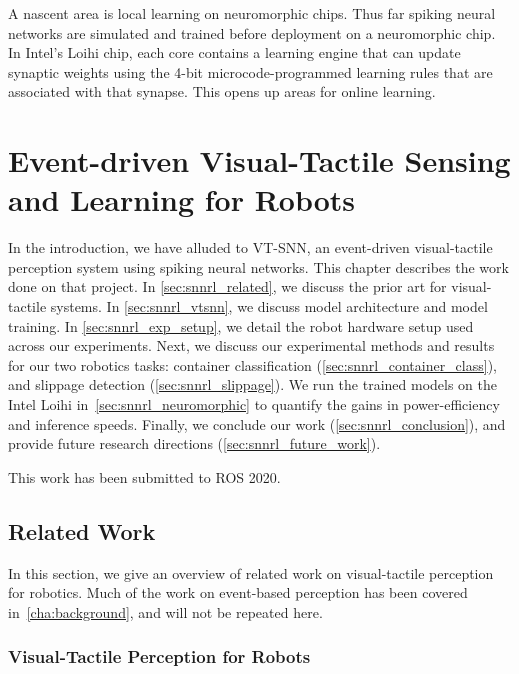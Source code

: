 \documentclass[fyp]{socreport}
\begin{document}
A nascent area is local learning on neuromorphic chips. Thus far spiking neural
networks are simulated and trained before deployment on a neuromorphic chip. In
Intel's Loihi chip, each core contains a learning engine that can update
synaptic weights using the 4-bit microcode-programmed learning rules that are
associated with that synapse. This opens up areas for online learning.

\chapter{Event-driven Visual-Tactile Sensing and Learning for Robots\label{cha:vtsnn}}

In the introduction, we have alluded to VT-SNN, an event-driven
visual-tactile perception system using spiking neural networks. This chapter
describes the work done on that project. In \autoref{sec:snnrl_related}, we
discuss the prior art for visual-tactile systems. In \autoref{sec:snnrl_vtsnn},
we discuss model architecture and model training. In
\autoref{sec:snnrl_exp_setup}, we detail the robot hardware setup used across
our experiments. Next, we discuss our experimental methods and results for our
two robotics tasks: container classification
(\autoref{sec:snnrl_container_class}), and slippage detection
(\autoref{sec:snnrl_slippage}). We run the trained models on the Intel Loihi
in~\autoref{sec:snnrl_neuromorphic} to quantify the gains in power-efficiency
and inference speeds. Finally, we conclude our work
(\autoref{sec:snnrl_conclusion}), and provide future research directions
(\autoref{sec:snnrl_future_work}).

This work has been submitted to ROS 2020.

\section{Related Work\label{sec:snnrl_related}}

In this section, we give an overview of related work on visual-tactile perception for robotics. Much of the work on event-based perception has been covered in~\autoref{cha:background}, and will not be repeated here.

\subsection{Visual-Tactile Perception for Robots}

\end{document}
